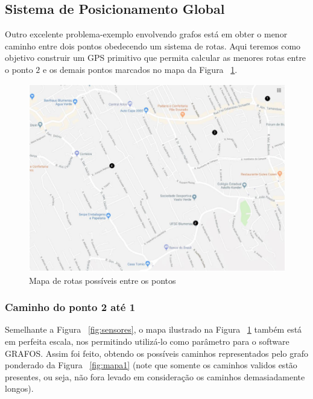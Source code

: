 \documentclass[a4paper,12pt]{article}
\begin{document}
\subsection{Sistema de Posicionamento Global}

Outro excelente problema-exemplo envolvendo grafos está em obter o menor caminho entre dois pontos obedecendo um sistema de rotas. Aqui teremos como objetivo construir um GPS primitivo que permita calcular as menores rotas entre o ponto $2$ e os demais pontos marcados no mapa da Figura ~\ref{fig:mapa}.

\begin{figure}[H]
	\begin{center}
		\includegraphics[width=0.85\linewidth]{mapa.png}
	\end{center}
	\caption{Mapa de rotas possíveis entre os pontos}
	\label{fig:mapa}
\end{figure}

\subsubsection*{Caminho do ponto 2 até 1}

Semelhante a Figura ~\ref{fig:sensores}, o mapa ilustrado na Figura ~\ref{fig:mapa} também está em perfeita escala, nos permitindo utilizá-lo como parâmetro para o software GRAFOS. Assim foi feito, obtendo os possíveis caminhos representados pelo grafo ponderado da Figura ~\ref{fig:mapa1} (note que somente os caminhos validos estão presentes, ou seja, não fora levado em consideração os caminhos demasiadamente longos).
\end{document}
